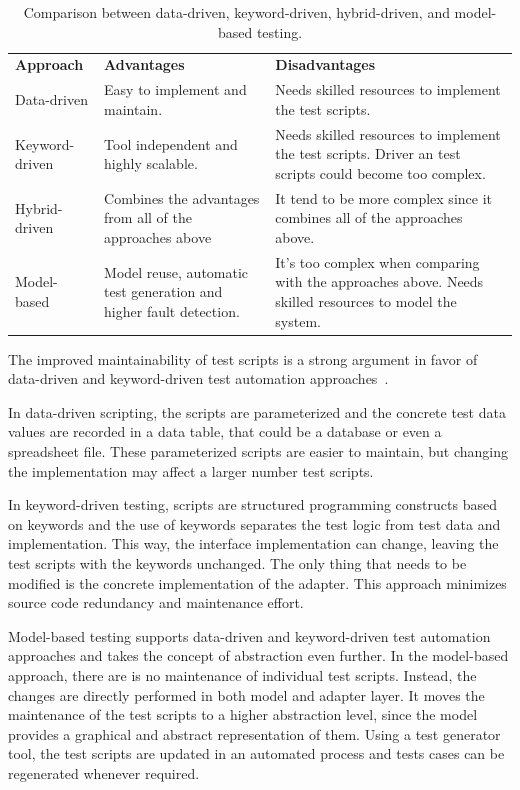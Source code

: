 \begin{table}[!ht]
\centering
\begin{tabular}{l|p{55mm}|p{55mm}}
\textbf{Approach} & \textbf{Advantages} & \textbf{Disadvantages} \\
Data-driven
  & Easy to implement and maintain.
  & Needs skilled resources to implement the test scripts. \\
Keyword-driven
  & Tool independent and highly scalable.
  & Needs skilled resources to implement the test scripts.
    Driver an test scripts could become too complex. \\
\hline
Hybrid-driven
  & Combines the advantages \newline from all of the approaches above
  & It tend to be more complex since \newline it combines all of the approaches above.\\
\hline
Model-based
  & Model reuse, automatic test generation and higher fault detection.
  & It's too complex when comparing with the approaches above.
    Needs skilled resources to model the system. \\
\end{tabular}
\caption{Comparison between data-driven, keyword-driven, hybrid-driven, and
  model-based testing.}
\label{table:comparison-between-approaches}
\end{table}

The improved maintainability of test scripts is a strong argument in favor of
data-driven and keyword-driven test automation approaches~\cite{Kramer2016}.

In data-driven scripting, the scripts are parameterized and the concrete test
data values are recorded in a data table, that could be a database or even a
spreadsheet file. These parameterized scripts are easier to maintain, but
changing the implementation may affect a larger number test scripts.

In keyword-driven testing, scripts are structured programming constructs
based on keywords and the use of keywords separates the test logic from test
data and implementation. This way, the interface implementation can change,
leaving the test scripts with the keywords unchanged. The only thing that needs
to be modified is the concrete implementation of the adapter. This approach
minimizes source code redundancy and maintenance effort.

Model-based testing supports data-driven and keyword-driven test automation
approaches and takes the concept of abstraction even further. In the model-based
approach, there are is no maintenance of individual test scripts. Instead, the
changes are directly performed in both model and adapter layer. It moves the
maintenance of the test scripts to a higher abstraction level, since the model
provides a graphical and abstract representation of them. Using a test generator
tool, the test scripts are updated in an automated process and tests cases can
be regenerated whenever required.

